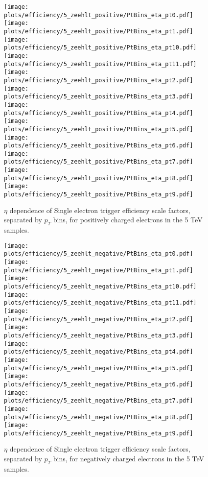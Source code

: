 \begin{figure}
\centering
\texttt{[image: plots/efficiency/5\_zeehlt\_positive/PtBins\_eta\_pt0.pdf]}
\texttt{[image: plots/efficiency/5\_zeehlt\_positive/PtBins\_eta\_pt1.pdf]}
\texttt{[image: plots/efficiency/5\_zeehlt\_positive/PtBins\_eta\_pt10.pdf]}
\texttt{[image: plots/efficiency/5\_zeehlt\_positive/PtBins\_eta\_pt11.pdf]}
\texttt{[image: plots/efficiency/5\_zeehlt\_positive/PtBins\_eta\_pt2.pdf]}
\texttt{[image: plots/efficiency/5\_zeehlt\_positive/PtBins\_eta\_pt3.pdf]}
\texttt{[image: plots/efficiency/5\_zeehlt\_positive/PtBins\_eta\_pt4.pdf]}
\texttt{[image: plots/efficiency/5\_zeehlt\_positive/PtBins\_eta\_pt5.pdf]}
\texttt{[image: plots/efficiency/5\_zeehlt\_positive/PtBins\_eta\_pt6.pdf]}
\texttt{[image: plots/efficiency/5\_zeehlt\_positive/PtBins\_eta\_pt7.pdf]}
\texttt{[image: plots/efficiency/5\_zeehlt\_positive/PtBins\_eta\_pt8.pdf]}
\texttt{[image: plots/efficiency/5\_zeehlt\_positive/PtBins\_eta\_pt9.pdf]}
\caption{$\eta$ dependence of Single electron trigger efficiency scale factors, separated by $p_T$ bins, for positively charged electrons in the 5 TeV samples.}
\label{fig:Eff:el:5:HLT:pos}
\end{figure}
\begin{figure}
\centering
\texttt{[image: plots/efficiency/5\_zeehlt\_negative/PtBins\_eta\_pt0.pdf]}
\texttt{[image: plots/efficiency/5\_zeehlt\_negative/PtBins\_eta\_pt1.pdf]}
\texttt{[image: plots/efficiency/5\_zeehlt\_negative/PtBins\_eta\_pt10.pdf]}
\texttt{[image: plots/efficiency/5\_zeehlt\_negative/PtBins\_eta\_pt11.pdf]}
\texttt{[image: plots/efficiency/5\_zeehlt\_negative/PtBins\_eta\_pt2.pdf]}
\texttt{[image: plots/efficiency/5\_zeehlt\_negative/PtBins\_eta\_pt3.pdf]}
\texttt{[image: plots/efficiency/5\_zeehlt\_negative/PtBins\_eta\_pt4.pdf]}
\texttt{[image: plots/efficiency/5\_zeehlt\_negative/PtBins\_eta\_pt5.pdf]}
\texttt{[image: plots/efficiency/5\_zeehlt\_negative/PtBins\_eta\_pt6.pdf]}
\texttt{[image: plots/efficiency/5\_zeehlt\_negative/PtBins\_eta\_pt7.pdf]}
\texttt{[image: plots/efficiency/5\_zeehlt\_negative/PtBins\_eta\_pt8.pdf]}
\texttt{[image: plots/efficiency/5\_zeehlt\_negative/PtBins\_eta\_pt9.pdf]}
\caption{$\eta$ dependence of Single electron trigger efficiency scale factors, separated by $p_T$ bins, for negatively charged electrons in the 5 TeV samples.}
\label{fig:Eff:el:5:HLT:neg}
\end{figure}
